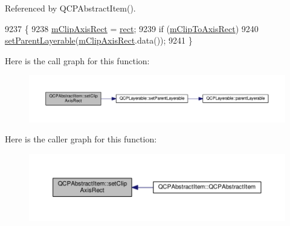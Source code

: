Referenced by Q\+C\+P\+Abstract\+Item().


\begin{DoxyCode}
9237                                                        \{
9238   \hyperlink{class_q_c_p_abstract_item_a3e57cfe7da4b1ac3d6fa7281ea437361}{mClipAxisRect} = \hyperlink{_gen_blob_8m_aea8f6815d9a63491fc422c5572c6b3c3}{rect};
9239   \textcolor{keywordflow}{if} (\hyperlink{class_q_c_p_abstract_item_ad2a70ff6b658fcb84a9427f69d3f587d}{mClipToAxisRect})
9240     \hyperlink{class_q_c_p_layerable_aa23c893671f1f6744ac235cf2204cf3a}{setParentLayerable}(\hyperlink{class_q_c_p_abstract_item_a3e57cfe7da4b1ac3d6fa7281ea437361}{mClipAxisRect}.data());
9241 \}
\end{DoxyCode}


Here is the call graph for this function\+:\nopagebreak
\begin{figure}[H]
\begin{center}
\leavevmode
\includegraphics[width=350pt]{class_q_c_p_abstract_item_a7dc75fcbcd10206fe0b75d757ea7a347_cgraph}
\end{center}
\end{figure}




Here is the caller graph for this function\+:\nopagebreak
\begin{figure}[H]
\begin{center}
\leavevmode
\includegraphics[width=350pt]{class_q_c_p_abstract_item_a7dc75fcbcd10206fe0b75d757ea7a347_icgraph}
\end{center}
\end{figure}


\hypertarget{class_q_c_p_abstract_item_a39e05b9d4176b9accafc746d16ca6a06}{}
